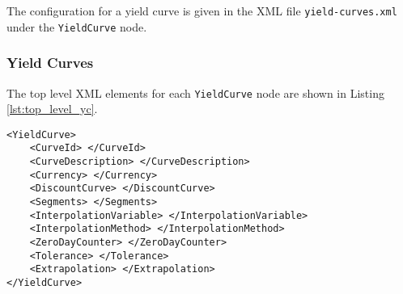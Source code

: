 The configuration for a yield curve is given in the XML file {\tt yield-curves.xml} under the \lstinline!YieldCurve! node.

\subsubsection{Yield Curves}
The top level XML elements for each \lstinline!YieldCurve! node are shown in Listing \ref{lst:top_level_yc}.

\begin{lstlisting}[caption=Top level yield curve node, label=lst:top_level_yc]
<YieldCurve>
	<CurveId> </CurveId>
	<CurveDescription> </CurveDescription>
	<Currency> </Currency>
	<DiscountCurve> </DiscountCurve>
	<Segments> </Segments>
	<InterpolationVariable> </InterpolationVariable>
	<InterpolationMethod> </InterpolationMethod>
	<ZeroDayCounter> </ZeroDayCounter>
	<Tolerance> </Tolerance>
	<Extrapolation> </Extrapolation>
</YieldCurve>
\end{lstlisting}

